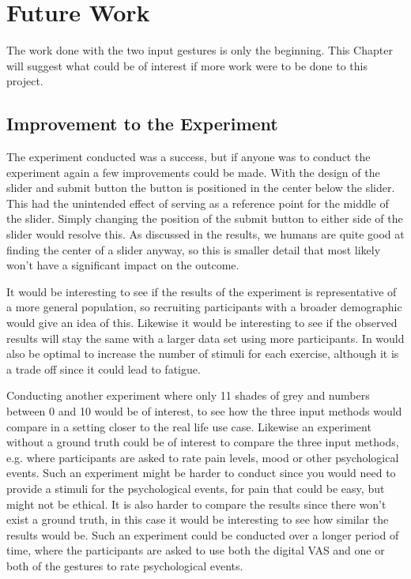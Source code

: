 \chapter{Future Work}\label{future_ch}
The work done with the two input gestures is only the beginning. This Chapter will suggest what could be of interest if more work were to be done to this project.

\section{Improvement to the Experiment}
The experiment conducted was a success, but if anyone was to conduct the experiment again a few improvements could be made. With the design of the slider and submit button the button is positioned in the center below the slider. This had the unintended effect of serving as a reference point for the middle of the slider. Simply changing the position of the submit button to either side of the slider would resolve this. As discussed in the results, we humans are quite good at finding the center of a slider anyway, so this is smaller detail that most likely won't have a significant impact on the outcome.

It would be interesting to see if the results of the experiment is representative of a more general population, so recruiting participants with a broader demographic would give an idea of this. Likewise it would be interesting to see if the observed results will stay the same with a larger data set using more participants. In would also be optimal to increase the number of stimuli for each exercise, although it is a trade off since it could lead to fatigue.

Conducting another experiment where only 11 shades of grey and numbers between 0 and 10 would be of interest, to see how the three input methods would compare in a setting closer to the real life use case. Likewise an experiment without a ground truth could be of interest to compare the three input methods, e.g. where participants are asked to rate pain levels, mood or other psychological events. Such an experiment might be harder to conduct since you would need to provide a stimuli for the psychological events, for pain that could be easy, but might not be ethical. It is also harder to compare the results since there won't exist a ground truth, in this case it would be interesting to see how similar the results would be. Such an experiment could be conducted over a longer period of time, where the participants are asked to use both the digital VAS and one or both of the gestures to rate psychological events.

